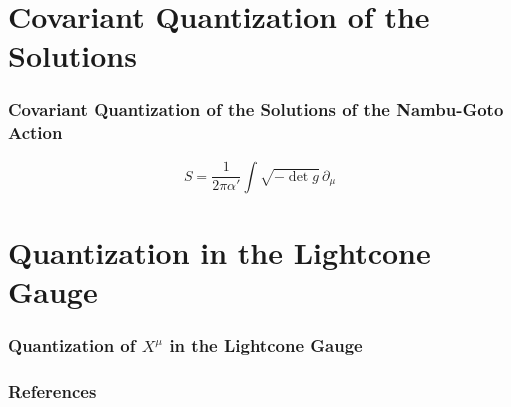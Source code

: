 \documentclass[aspectratio=169]{beamer}
\begin{document}
	\section{Covariant Quantization of the Solutions}
	
	\begin{frame}
		\frametitle{Covariant Quantization of the Solutions of the Nambu-Goto Action}
		
		\begin{equation}
			S = \frac{1}{2\pi\alpha'}\int\sqrt{-\det g} \, \partial_\mu
		\end{equation}
	
	\end{frame}	

	\section{Quantization in the Lightcone Gauge}
	
	\begin{frame}
		\frametitle{Quantization of $X^\mu$ in the Lightcone Gauge}
	\end{frame}

	\begin{frame}
		\frametitle{References}
		\printbibliography
	\end{frame}
\end{document}
